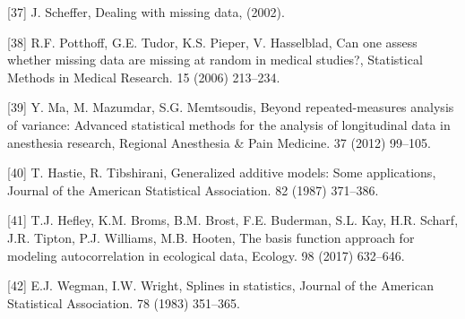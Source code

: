 \documentclass[
]{article}
\begin{document}
\leavevmode\hypertarget{ref-scheffer2002}{}%
{[}37{]} J. Scheffer, Dealing with missing data, (2002).

\leavevmode\hypertarget{ref-potthoff2006}{}%
{[}38{]} R.F. Potthoff, G.E. Tudor, K.S. Pieper, V. Hasselblad, Can one assess whether missing data are missing at random in medical studies?, Statistical Methods in Medical Research. 15 (2006) 213--234.

\leavevmode\hypertarget{ref-ma2012}{}%
{[}39{]} Y. Ma, M. Mazumdar, S.G. Memtsoudis, Beyond repeated-measures analysis of variance: Advanced statistical methods for the analysis of longitudinal data in anesthesia research, Regional Anesthesia \& Pain Medicine. 37 (2012) 99--105.

\leavevmode\hypertarget{ref-hastie1987}{}%
{[}40{]} T. Hastie, R. Tibshirani, Generalized additive models: Some applications, Journal of the American Statistical Association. 82 (1987) 371--386.

\leavevmode\hypertarget{ref-hefley2017}{}%
{[}41{]} T.J. Hefley, K.M. Broms, B.M. Brost, F.E. Buderman, S.L. Kay, H.R. Scharf, J.R. Tipton, P.J. Williams, M.B. Hooten, The basis function approach for modeling autocorrelation in ecological data, Ecology. 98 (2017) 632--646.

\leavevmode\hypertarget{ref-wegman1983}{}%
{[}42{]} E.J. Wegman, I.W. Wright, Splines in statistics, Journal of the American Statistical Association. 78 (1983) 351--365.
\end{document}
